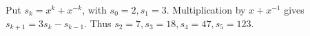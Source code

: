 Put $s_k=x^k+x^{-k}$, with $s_0=2,s_1=3$. Multiplication by $x+x^{-1}$ gives $s_{k+1}=3s_k-s_{k-1}$. Thus $s_2=7,s_3=18,s_4=47,s_5=\boxed{123}$.
